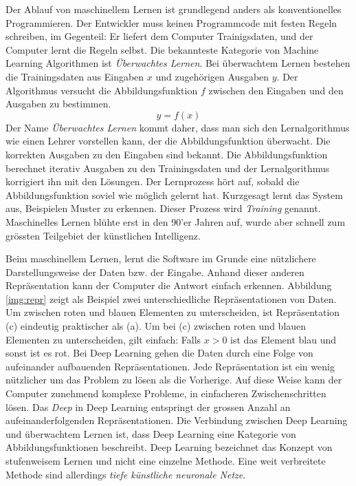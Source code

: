 Der Ablauf von maschinellem Lernen ist grundlegend anders als konventionelles Programmieren. Der Entwickler muss keinen Programmcode mit festen Regeln schreiben, im Gegenteil: Er liefert dem Computer Trainigsdaten, und der Computer lernt die Regeln selbst. Die bekannteste Kategorie von Machine Learning Algorithmen ist \textit{Überwachtes Lernen}. Bei überwachtem Lernen bestehen die Trainingsdaten aus Eingaben $x$ und zugehörigen Ausgaben $y$. Der Algorithmus versucht die Abbildungsfunktion $f$ zwischen den Eingaben und den Ausgaben zu bestimmen. 
$$ y = f(x)$$
Der Name \textit{Überwachtes Lernen} kommt daher, dass man sich den Lernalgorithmus wie einen Lehrer vorstellen kann, der die Abbildungsfunktion überwacht. Die korrekten Ausgaben zu den Eingaben sind bekannt. Die Abbildungsfunktion berechnet iterativ Ausgaben zu den Trainingsdaten und der Lernalgorithmus korrigiert ihn mit den Lösungen. Der Lernprozess hört auf, sobald die Abbildungsfunktion soviel wie möglich gelernt hat. Kurzgesagt lernt das System aus, Beispielen Muster zu erkennen. Dieser Prozess wird \textit{Training} genannt. Maschinelles Lernen blühte erst in den 90'er Jahren auf, wurde aber schnell zum grössten Teilgebiet der künstlichen Intelligenz. \parencite[vgl. ][Kap. 1.1.2]{chollet} \parencite[vgl. ][]{supervised}

Beim maschinellem Lernen, lernt die Software im Grunde eine nützlichere Darstellungsweise der Daten bzw. der Eingabe. Anhand dieser anderen Repräsentation kann der Computer die Antwort einfach erkennen. Abbildung \ref{img:repr} zeigt als Beispiel  zwei unterschiedliche Repräsentationen von Daten. Um zwischen roten und blauen Elementen zu unterscheiden, ist Repräsentation (c) eindeutig praktischer als (a). Um bei (c) zwischen roten und blauen Elementen zu unterscheiden, gilt einfach: Falls $x>0$ ist das Element blau und sonst ist es rot. Bei Deep Learning gehen die Daten durch eine Folge von aufeinander aufbauenden Repräsentationen. Jede Repräsentation ist ein wenig nützlicher um das Problem zu lösen als die Vorherige.  Auf diese Weise kann der Computer zunehmend komplexe Probleme, in einfacheren Zwischenschritten lösen. Das \textit{Deep} in Deep Learning entspringt der grossen Anzahl an aufeinanderfolgenden Repräsentationen. Die Verbindung zwischen Deep Learning und überwachtem Lernen ist, dass Deep Learning eine Kategorie von Abbildungsfunktionen beschreibt. Deep Learning bezeichnet das Konzept von stufenweisem Lernen und nicht eine einzelne Methode.  Eine weit verbreitete Methode sind allerdings \textit{tiefe künstliche neuronale Netze}. \parencite[vgl.][]{chollet} 

